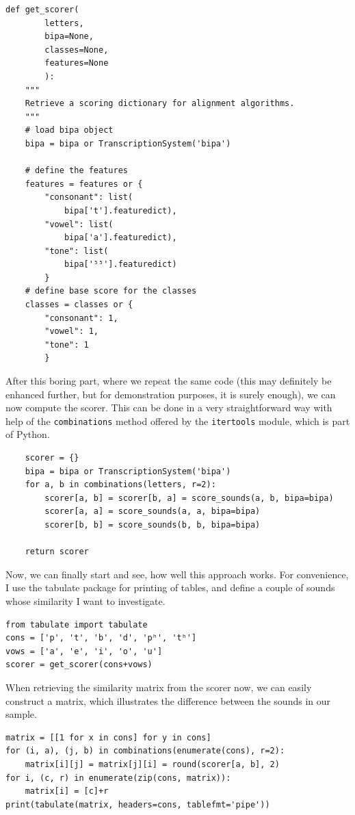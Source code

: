 \documentclass[
  a4paper,
  14pt,
  oneside,
  tablecaptionabove
]{scrbook}
\newcommand{\passthrough}[1]{#1}
\begin{document}
\begin{lstlisting}
def get_scorer(
        letters,
        bipa=None,
        classes=None,
        features=None
        ):
    """
    Retrieve a scoring dictionary for alignment algorithms.
    """
    # load bipa object
    bipa = bipa or TranscriptionSystem('bipa')

    # define the features
    features = features or {
        "consonant": list(
            bipa['t'].featuredict),
        "vowel": list(
            bipa['a'].featuredict),
        "tone": list(
            bipa['⁵⁵'].featuredict)
        }
    # define base score for the classes
    classes = classes or {
        "consonant": 1,
        "vowel": 1,
        "tone": 1
        }
\end{lstlisting}

After this boring part, where we repeat the same code (this may
definitely be enhanced further, but for demonstration purposes, it is
surely enough), we can now compute the scorer. This can be done in a
very straightforward way with help of the
\passthrough{\lstinline!combinations!} method offered by the
\passthrough{\lstinline!itertools!} module, which is part of Python.

\begin{lstlisting}
    scorer = {}
    bipa = bipa or TranscriptionSystem('bipa')
    for a, b in combinations(letters, r=2):
        scorer[a, b] = scorer[b, a] = score_sounds(a, b, bipa=bipa)
        scorer[a, a] = score_sounds(a, a, bipa=bipa)
        scorer[b, b] = score_sounds(b, b, bipa=bipa)

    return scorer
\end{lstlisting}

Now, we can finally start and see, how well this approach works. For
convenience, I use the tabulate package for printing of tables, and
define a couple of sounds whose similarity I want to investigate.

\begin{lstlisting}
from tabulate import tabulate
cons = ['p', 't', 'b', 'd', 'pʰ', 'tʰ']
vows = ['a', 'e', 'i', 'o', 'u']
scorer = get_scorer(cons+vows)
\end{lstlisting}

When retrieving the similarity matrix from the scorer now, we can easily
construct a matrix, which illustrates the difference between the sounds
in our sample.

\begin{lstlisting}
matrix = [[1 for x in cons] for y in cons]
for (i, a), (j, b) in combinations(enumerate(cons), r=2):
    matrix[i][j] = matrix[j][i] = round(scorer[a, b], 2)
for i, (c, r) in enumerate(zip(cons, matrix)):
    matrix[i] = [c]+r
print(tabulate(matrix, headers=cons, tablefmt='pipe'))
\end{lstlisting}
\end{document}
